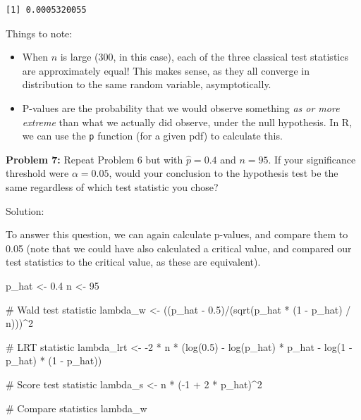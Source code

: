\documentclass[
  letterpaper,
  DIV=11,
  numbers=noendperiod]{scrreprt}
\newenvironment{Shaded}{\begin{snugshade}}{\end{snugshade}}
\newcommand{\CommentTok}[1]{\textcolor[rgb]{0.37,0.37,0.37}{#1}}
\newcommand{\DecValTok}[1]{\textcolor[rgb]{0.68,0.00,0.00}{#1}}
\newcommand{\FloatTok}[1]{\textcolor[rgb]{0.68,0.00,0.00}{#1}}
\newcommand{\FunctionTok}[1]{\textcolor[rgb]{0.28,0.35,0.67}{#1}}
\newcommand{\NormalTok}[1]{\textcolor[rgb]{0.00,0.23,0.31}{#1}}
\newcommand{\OtherTok}[1]{\textcolor[rgb]{0.00,0.23,0.31}{#1}}
\newcommand{\SpecialCharTok}[1]{\textcolor[rgb]{0.37,0.37,0.37}{#1}}
\begin{document}
\begin{verbatim}
[1] 0.0005320055
\end{verbatim}

Things to note:

\begin{itemize}
\item
  When \(n\) is large (300, in this case), each of the three classical
  test statistics are approximately equal! This makes sense, as they all
  converge in distribution to the same random variable, asymptotically.
\item
  P-values are the probability that we would observe something \emph{as
  or more extreme} than what we actually did observe, under the null
  hypothesis. In R, we can use the \texttt{p} function (for a given pdf)
  to calculate this.
\end{itemize}

\textbf{Problem 7:} Repeat Problem 6 but with \(\hat{p} = 0.4\) and
\(n = 95\). If your significance threshold were \(\alpha = 0.05\), would
your conclusion to the hypothesis test be the same regardless of which
test statistic you chose?

Solution:

To answer this question, we can again calculate p-values, and compare
them to 0.05 (note that we could have also calculated a critical value,
and compared our test statistics to the critical value, as these are
equivalent).

\begin{Shaded}
\begin{Highlighting}[]
\NormalTok{p\_hat }\OtherTok{\textless{}{-}} \FloatTok{0.4}
\NormalTok{n }\OtherTok{\textless{}{-}} \DecValTok{95}

\CommentTok{\# Wald test statistic}
\NormalTok{lambda\_w }\OtherTok{\textless{}{-}}\NormalTok{ ((p\_hat }\SpecialCharTok{{-}} \FloatTok{0.5}\NormalTok{)}\SpecialCharTok{/}\NormalTok{(}\FunctionTok{sqrt}\NormalTok{(p\_hat }\SpecialCharTok{*}\NormalTok{ (}\DecValTok{1} \SpecialCharTok{{-}}\NormalTok{ p\_hat) }\SpecialCharTok{/}\NormalTok{ n)))}\SpecialCharTok{\^{}}\DecValTok{2}

\CommentTok{\# LRT statistic}
\NormalTok{lambda\_lrt }\OtherTok{\textless{}{-}} \SpecialCharTok{{-}}\DecValTok{2} \SpecialCharTok{*}\NormalTok{ n }\SpecialCharTok{*}\NormalTok{ (}\FunctionTok{log}\NormalTok{(}\FloatTok{0.5}\NormalTok{) }\SpecialCharTok{{-}} \FunctionTok{log}\NormalTok{(p\_hat) }\SpecialCharTok{*}\NormalTok{ p\_hat }\SpecialCharTok{{-}} \FunctionTok{log}\NormalTok{(}\DecValTok{1} \SpecialCharTok{{-}}\NormalTok{ p\_hat) }\SpecialCharTok{*}\NormalTok{ (}\DecValTok{1} \SpecialCharTok{{-}}\NormalTok{ p\_hat))}

\CommentTok{\# Score test statistic}
\NormalTok{lambda\_s }\OtherTok{\textless{}{-}}\NormalTok{ n }\SpecialCharTok{*}\NormalTok{ (}\SpecialCharTok{{-}}\DecValTok{1} \SpecialCharTok{+} \DecValTok{2} \SpecialCharTok{*}\NormalTok{ p\_hat)}\SpecialCharTok{\^{}}\DecValTok{2}

\CommentTok{\# Compare statistics}
\NormalTok{lambda\_w}
\end{Highlighting}
\end{Shaded}
\end{document}
